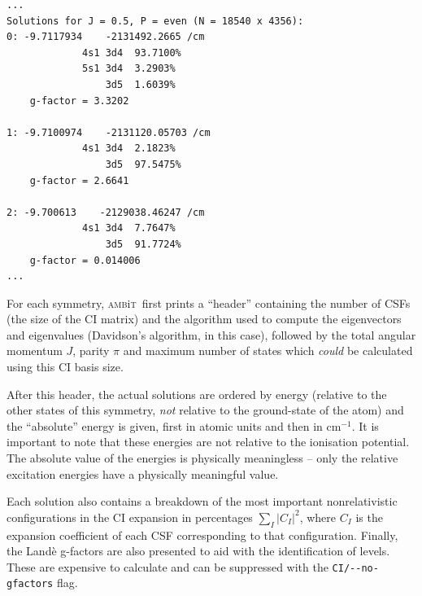 \documentclass{report}
\newcommand{\ambit}{\textsc{amb}{\footnotesize i}\textsc{t}}
\begin{document}
\begin{verbatim}
...
Solutions for J = 0.5, P = even (N = 18540 x 4356):                            
0: -9.7117934    -2131492.2665 /cm                                             
             4s1 3d4  93.7100%                                                 
             5s1 3d4  3.2903%                                                  
                 3d5  1.6039%                                                  
    g-factor = 3.3202                                                          
                                                                               
1: -9.7100974    -2131120.05703 /cm                                            
             4s1 3d4  2.1823%                                                  
                 3d5  97.5475%                                                 
    g-factor = 2.6641                                                          
                                                                               
2: -9.700613    -2129038.46247 /cm                                             
             4s1 3d4  7.7647%                                                  
                 3d5  91.7724%                                                 
    g-factor = 0.014006 
...
\end{verbatim}

For each symmetry, \ambit\  first prints a ``header'' containing the number of CSFs 
(the size of the CI matrix) and the algorithm used to compute the eigenvectors and eigenvalues 
(Davidson's algorithm, in this case), followed by the total angular momentum $J$, parity $\pi$ and 
maximum number of states which \textit{could} be calculated using this CI basis size.

After this header, the actual solutions are ordered by energy (relative to the other states of this
symmetry, \emph{not} relative to the ground-state of the atom) and the ``absolute'' energy is given,
first in atomic units and then in cm$^{-1}$. It is important to note that these energies are not
relative to the ionisation potential. The absolute value of the energies is physically meaningless --
only the relative excitation energies have a physically meaningful value.

Each solution also contains a breakdown of the most important nonrelativistic configurations in the CI
expansion in percentages $\displaystyle \sum_I |C_I|^2$, where $C_I$ is the expansion coefficient of
each CSF corresponding to that configuration. Finally, the Land\`{e} g-factors are also presented to aid
with the identification of levels. These are expensive to calculate and can be suppressed with the
\texttt{CI/{-}{-}no-gfactors} flag.
\end{document}
